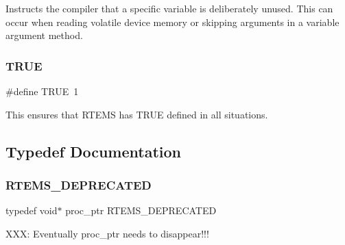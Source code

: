 Instructs the compiler that a specific variable is deliberately unused. This can occur when reading volatile device memory or skipping arguments in a variable argument method. \mbox{\label{group__RTEMSScoreBaseDefs_gaa8cecfc5c5c054d2875c03e77b7be15d}} 
\subsubsection{\texorpdfstring{TRUE}{TRUE}}
{\footnotesize\ttfamily \#define T\+R\+UE~1}

This ensures that R\+T\+E\+MS has T\+R\+UE defined in all situations. 

\subsection{Typedef Documentation}
\mbox{\label{group__RTEMSScoreBaseDefs_gab651a076d4d51d50221e7ef7ac99d4e7}} 
\subsubsection{\texorpdfstring{RTEMS\_DEPRECATED}{RTEMS\_DEPRECATED}}
{\footnotesize\ttfamily typedef void$\ast$ proc\+\_\+ptr R\+T\+E\+M\+S\+\_\+\+D\+E\+P\+R\+E\+C\+A\+T\+ED}

X\+XX\+: Eventually proc\+\_\+ptr needs to disappear!!! 